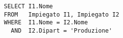 \begin{lstlisting}
SELECT I1.Nome
FROM   Impiegato I1, Impiegato I2
WHERE  I1.Nome = I2.Nome
  AND  I2.Dipart = 'Produzione'
\end{lstlisting}
